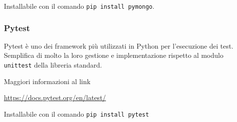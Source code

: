Installabile con il comando \texttt{pip install pymongo}.

\subsubsection{Pytest}
Pytest è uno dei framework più utilizzati in Python per l'esecuzione dei test. Semplifica di molto la loro gestione e implementazione rispetto al modulo \texttt{unittest}
della libreria standard.

Maggiori informazioni al link

\begin{center}
    \url{https://docs.pytest.org/en/latest/}
\end{center}

Installabile con il comando \texttt{pip install pytest}
